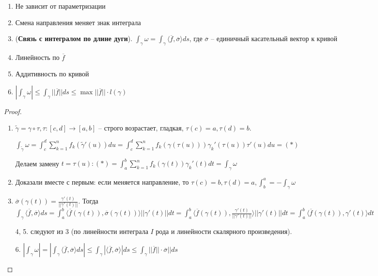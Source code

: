 \begin{properties}
    \begin{enumerate}
        \item Не зависит от параметризации
        \item Смена направления меняет знак интеграла
        \item (\textbf{Связь с интегралом по длине дуги}). $\int_{\gamma}^{}\omega = \int_{\gamma}^{}\langle \overline{f}, \overline{\sigma} \rangle ds$, где $\overline{\sigma}$ -- единичный касательный вектор к кривой
        \item Линейность по $\overline{f}$
        \item Аддитивность по кривой
        \item $|\int_{\gamma}^{}\omega| \leq \int_{\gamma}^{}||\overline{f}||ds \leq \max ||\overline{f}|| \cdot l(\gamma)$
    \end{enumerate}
\end{properties}

\begin{proof}
    \begin{enumerate}
        \item $\tilde{\gamma} = \gamma \circ \tau, \tau : [c, d] \to [a, b]$ -- строго возрастает, гладкая, $\tau(c) = a, \tau(d) = b$.

        $\int_{\tilde{\gamma}}^{}\omega = \int_{c}^{d}\sum_{k = 1}^{n}f_k(\tilde{\gamma}'(u))du = \int_{c}^{d}\sum_{k = 1}^{n}f_k(\gamma(\tau(u)))\gamma_k'(\tau(u))\tau'(u)du = (*)$

        Делаем замену $t = \tau(u): (*) = \int_{a}^{b}\sum_{k = 1}^{n}f_k(\gamma(t))\gamma_k'(t)dt = \int_{\gamma}^{}\omega$

        \item Доказали вместе с первым: если меняется направление, то $\tau(c) = b, \tau(d) = a, \int_{b}^{a} = -\int_{\gamma}^{}\omega$

        \item $\overline{\sigma}(\gamma(t)) = \frac{\gamma'(t)}{||\gamma'(t)||}$. Тогда $\int_{\gamma}^{}\langle \overline{f}, \overline{\sigma} \rangle ds = \int_{a}^{b}\langle \overline{f}(\gamma(t)), \overline{\sigma}(\gamma(t)) \rangle ||\gamma'(t)|| dt = \int_{a}^{b} \langle \overline{f}(\gamma(t)), \frac{\gamma'(t)}{||\gamma'(t)||} \rangle||\gamma'(t)||dt = \int_{a}^{b} \langle \overline{f}(\gamma(t)), \gamma'(t) \rangle dt$
        \item[4, 5.] следуют из 3 (по линейности интеграла $I$ рода и линейности скалярного произведения).
        \item[6.] $|\int_{\gamma}^{}\omega| = |\int_{\gamma}^{} \langle \overline{f}, \overline{\sigma} \rangle ds| \leq \int_{\gamma}^{}|\langle \overline{f}, \overline{\sigma} \rangle| ds \leq \int_{\gamma}^{}||\overline{f}|| \cdot \overline{\sigma} || ds$
    \end{enumerate}
\end{proof}

